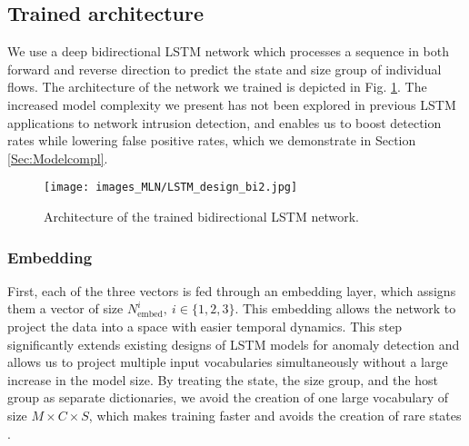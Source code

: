 \subsection{Trained architecture}


We use a deep bidirectional LSTM network which processes a sequence in both forward and reverse direction to predict the state and size group of individual flows.
The architecture of the network we trained is depicted in Fig. \ref{fig:rnn_FSA}. The increased model complexity we present has not been explored in previous LSTM applications to network intrusion detection, and enables us to boost detection rates while lowering false positive rates, which we demonstrate in Section \ref{Sec:Modelcompl}.
\begin{figure}
    \begin{center}
      \texttt{[image: images\_MLN/LSTM\_design\_bi2.jpg]}
    \end{center}
    \vspace{-15pt}
    \caption{Architecture of the trained bidirectional LSTM network. }\label{fig:rnn_FSA}
\end{figure}

\subsubsection{Embedding}
First, each of the three vectors is fed through an embedding layer, which assigns them a vector of size $N^i_{\text{embed}}, ~i\in\{1,2,3\}$. This embedding allows the network to project the data into a space with easier temporal dynamics. This step significantly extends existing designs of LSTM models for anomaly detection and allows us to project multiple input vocabularies simultaneously without a large increase in the model size. 
By treating the state, the size group, and the host group as separate dictionaries, we avoid the creation of one large vocabulary of size $M\times C \times S$, which makes training faster and avoids the creation of rare states \cite{chen2015strategies}. 

